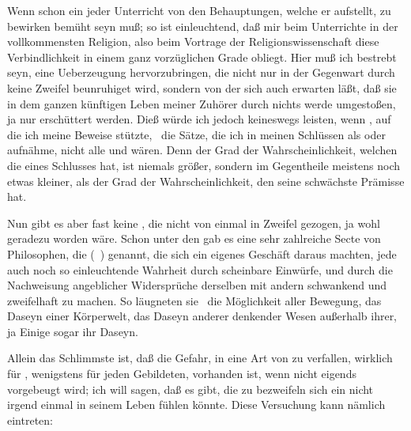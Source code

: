 Wenn schon ein jeder Unterricht von den Behauptungen, welche er aufstellt,  zu bewirken bemüht seyn muß; so ist einleuchtend, daß mir beim Unterrichte in der vollkommensten Religion, also beim Vortrage der Religionswissenschaft diese Verbindlichkeit in einem ganz vorzüglichen Grade obliegt. Hier muß ich bestrebt seyn, eine Ueberzeugung hervorzubringen, die nicht nur in der Gegenwart durch keine Zweifel beunruhiget wird, sondern von der sich auch erwarten läßt, daß sie in dem ganzen künftigen Leben meiner Zuhörer durch nichts werde umgestoßen, ja nur erschüttert werden. Dieß würde ich jedoch keineswegs leisten, wenn , auf die ich meine Beweise stützte, \dh\ die Sätze, die ich in meinen Schlüssen als  oder  aufnähme, nicht alle  und  wären. Denn der Grad der Wahrscheinlichkeit, welchen die  eines Schlusses hat, ist niemals größer, sondern im Gegentheile meistens noch etwas kleiner, als der Grad der Wahrscheinlichkeit, den seine schwächste Prämisse hat.\par
Nun gibt es aber fast keine , die nicht von  einmal in Zweifel gezogen, ja wohl geradezu  worden wäre. Schon unter den  gab es eine sehr zahlreiche Secte von Philosophen, die  (\dh\ ) genannt, die sich ein eigenes Geschäft daraus machten, jede auch noch so einleuchtende Wahrheit durch scheinbare Einwürfe, und durch die Nachweisung angeblicher Widersprüche derselben mit andern schwankend und zweifelhaft zu machen. So läugneten sie \zB\ die Möglichkeit aller Bewegung, das Daseyn einer Körperwelt, das Daseyn anderer denkender Wesen außerhalb ihrer, ja Einige sogar ihr  Daseyn.~\par
Allein das Schlimmste ist, daß die Gefahr, in eine Art von  zu verfallen, wirklich für , wenigstens für jeden Gebildeten, vorhanden ist, wenn nicht eigends vorgebeugt wird; ich will sagen, daß es  gibt, die zu bezweifeln sich ein  nicht irgend einmal in seinem Leben  fühlen könnte. Diese Versuchung kann nämlich eintreten:

